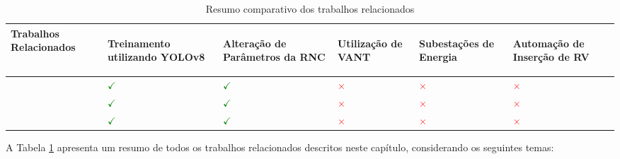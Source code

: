 \begin{table}[!hbt]
    \centering
    \caption{Resumo comparativo dos trabalhos relacionados}
    \begin{tabular}{ >{\centering\arraybackslash}m{5cm} | >{\centering\arraybackslash}m{2cm} | >{\centering\arraybackslash}m{2cm} | >{\centering\arraybackslash}m{2cm} | >{\centering\arraybackslash}m{2cm} | >{\centering\arraybackslash}m{2cm} }
    \hline
    \cellcolor[gray]{0.9} \textbf{Trabalhos Relacionados} & 
    \cellcolor[gray]{0.9} \begin{sideways} \textbf{Treinamento utilizando YOLOv8} \end{sideways} & 
    \cellcolor[gray]{0.9} \begin{sideways} \textbf{Alteração de Parâmetros da RNC} \end{sideways} & 
    \cellcolor[gray]{0.9} \begin{sideways} \textbf{Utilização de VANT} \end{sideways} & 
    \cellcolor[gray]{0.9} \begin{sideways} \textbf{Subestações de Energia} \end{sideways} &
    \cellcolor[gray]{0.9} \begin{sideways} \textbf{Automação de Inserção de RV} \end{sideways} \\
    \hline 
    \cite{gonzaga2023identificaccao} & \textcolor{green}{\(\checkmark\)} & \textcolor{green}{\(\checkmark\)} & \textcolor{red}{\(\times\)} & \textcolor{red}{\(\times\)} & \textcolor{red}{\(\times\)} \\
    \hline
    \cite{wang2023uav} & \textcolor{green}{\(\checkmark\)} & \textcolor{green}{\(\checkmark\)} & \textcolor{red}{\(\times\)} & \textcolor{red}{\(\times\)} & \textcolor{red}{\(\times\)} \\
    \hline
    \cite{bazame2022detection} & \textcolor{green}{\(\checkmark\)} & \textcolor{green}{\(\checkmark\)} & \textcolor{red}{\(\times\)} & \textcolor{red}{\(\times\)} & \textcolor{red}{\(\times\)} \\
    \end{tabular}
    \label{tab:relacionado1}
\end{table}

A Tabela \ref{tab:relacionado1} apresenta um resumo de todos os trabalhos relacionados descritos neste capítulo, considerando os seguintes temas:

